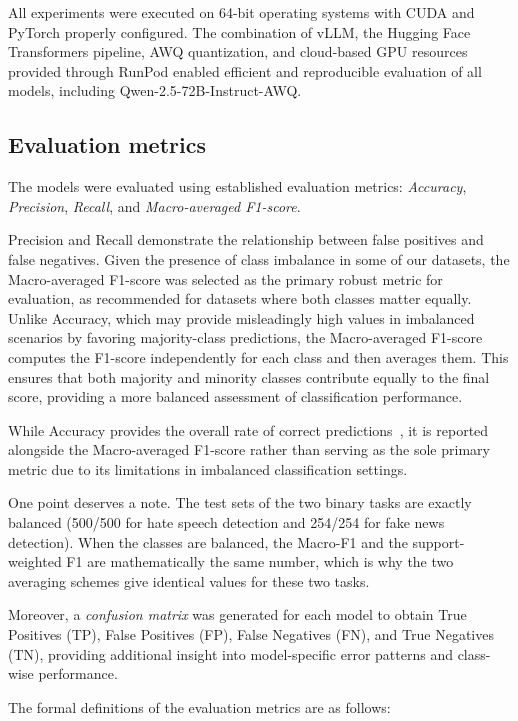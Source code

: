 \documentclass[10pt,letterpaper]{article}
\begin{document}
All experiments were executed on 64-bit operating systems with CUDA and PyTorch properly configured. The combination of vLLM, the Hugging Face Transformers pipeline, AWQ quantization, and cloud-based GPU resources provided through RunPod enabled efficient and reproducible evaluation of all models, including Qwen-2.5-72B-Instruct-AWQ.




\subsection*{Evaluation metrics}
\label{sec:evaluation_metrics}
The models were evaluated using established evaluation metrics: \textit{Accuracy}, \textit{Precision}, \textit{Recall}, and \textit{Macro-averaged F1-score}. 

Precision and Recall demonstrate the relationship between false positives and false negatives. Given the presence of class imbalance in some of our datasets, the Macro-averaged F1-score was selected as the primary robust metric for evaluation, as recommended for datasets where both classes matter equally. Unlike Accuracy, which may provide misleadingly high values in imbalanced scenarios by favoring majority-class predictions, the Macro-averaged F1-score computes the F1-score independently for each class and then averages them. This ensures that both majority and minority classes contribute equally to the final score, providing a more balanced assessment of classification performance.

While Accuracy provides the overall rate of correct predictions~\cite{b44}, it is reported alongside the Macro-averaged F1-score rather than serving as the sole primary metric due to its limitations in imbalanced classification settings.

One point deserves a note. The test sets of the two binary tasks are exactly balanced (500/500 for hate speech detection and 254/254 for fake news detection). When the classes are balanced, the Macro-F1 and the support-weighted F1 are mathematically the same number, which is why the two averaging schemes give identical values for these two tasks.

Moreover, a \textit{confusion matrix} was generated for each model to obtain True Positives (TP), False Positives (FP), False Negatives (FN), and True Negatives (TN), providing additional insight into model-specific error patterns and class-wise performance.

The formal definitions of the evaluation metrics are as follows:
\end{document}
